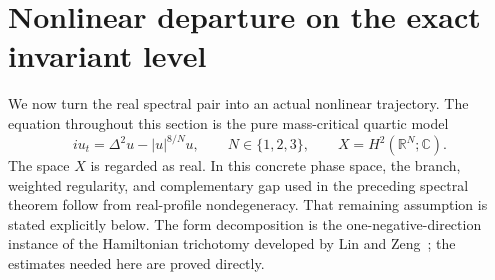 \section{Nonlinear departure on the exact invariant level}
\label{sec:r12-nonlinear}

We now turn the real spectral pair into an actual nonlinear trajectory.
The equation throughout this section is the pure mass-critical quartic
model
\begin{equation}\label{eq:r12-pure-quartic}
 iu_t=\Delta^2u-|u|^{8/N}u,\qquad N\in\{1,2,3\},
 \qquad X=H^2(\mathbb R^N;\mathbb C).
\end{equation}
The space $X$ is regarded as real. In this concrete phase space, the
branch, weighted regularity, and complementary gap used in the preceding
spectral theorem follow from real-profile nondegeneracy. That remaining
assumption is stated explicitly below. The form decomposition is the
one-negative-direction instance of the Hamiltonian trichotomy developed
by Lin and Zeng~\cite{LZ}; the estimates needed here are proved directly.


